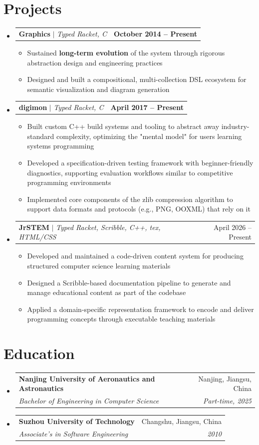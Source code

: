 \documentclass[letterpaper,11pt]{article}
\makeatletter
\newcommand{\resumeItem}[1]{
  \item\small{
    {#1 \vspace{-2pt}}
  }
}
\newcommand{\resumeSubheading}[4]{
  \vspace{-2pt}\item
    \begin{tabular*}{0.97\textwidth}[t]{l@{\extracolsep{\fill}}r}
      \textbf{#1} & #2 \\
      \textit{\small#3} & \textit{\small #4} \\
    \end{tabular*}\vspace{-7pt}
}
\newcommand{\resumeProjectHeading}[2]{
    \item
    \begin{tabular*}{0.97\textwidth}{l@{\extracolsep{\fill}}r}
      \small#1 & #2 \\
    \end{tabular*}\vspace{-7pt}
}
\newcommand{\resumeSubHeadingListStart}{\begin{itemize}[leftmargin=0.15in, label={}]}
\newcommand{\resumeSubHeadingListEnd}{\end{itemize}}
\newcommand{\resumeItemListStart}{\begin{itemize}}
\newcommand{\resumeItemListEnd}{\end{itemize}\vspace{-5pt}}
\makeatother
\begin{document}
\section{Projects}
    \resumeSubHeadingListStart
      \resumeProjectHeading
          {\textbf{Graphics} $|$ \emph{Typed Racket, C}}{\textbf{October 2014 -- Present}}
          \resumeItemListStart
            \resumeItem{Sustained \textbf{long-term evolution} of the system through rigorous abstraction design and engineering practices}
            \resumeItem{Designed and built a compositional, multi-collection DSL ecosystem for semantic visualization and diagram generation}
          \resumeItemListEnd
      \resumeProjectHeading
          {\textbf{digimon} $|$ \emph{Typed Racket, C}}{\textbf{April 2017 -- Present}}
          \resumeItemListStart
            \resumeItem{Built custom C++ build systems and tooling to abstract away industry-standard complexity,
              optimizing the "mental model" for users learning systems programming}
            \resumeItem{Developed a specification-driven testing framework with beginner-friendly diagnostics,
              supporting evaluation workflows similar to competitive programming environments}
            \resumeItem{Implemented core components of the zlib compression algorithm to support data formats and protocols (e.g., PNG, OOXML) that rely on it}
          \resumeItemListEnd
      \resumeProjectHeading
          {\textbf{JrSTEM} $|$ \emph{Typed Racket, Scribble, C++, tex, HTML/CSS}}{April 2026 -- Present}
          \resumeItemListStart
            \resumeItem{Developed and maintained a code-driven content system for producing structured computer science learning materials}
            \resumeItem{Designed a Scribble-based documentation pipeline to generate and manage educational content as part of the codebase}
            \resumeItem{Applied a domain-specific representation framework to encode and deliver programming concepts through executable teaching materials}
          \resumeItemListEnd
    \resumeSubHeadingListEnd

\section{Education}
\resumeSubHeadingListStart
    \resumeSubheading
      {Nanjing University of Aeronautics and Astronautics}{Nanjing, Jiangsu, China}
      {Bachelor of Engineering in Computer Science}{Part-time, 2025}
    \resumeSubheading
      {Suzhou University of Technology}{Changshu, Jiangsu, China}
      {Associate's in Software Engineering}{2010}
\resumeSubHeadingListEnd
\end{document}
